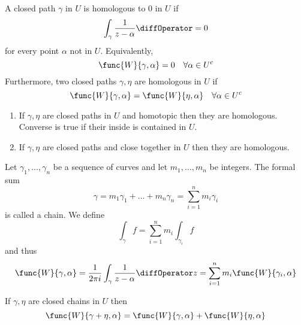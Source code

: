 \begin{definition}
    A closed path \(\gamma\) in \(U\) is homologous to 0 in \(U\) if 
    \begin{equation*}
        \int_{\gamma} \dfrac{1}{z - \alpha} \diffOperator = 0
    \end{equation*}
    for every point \(\alpha\) not in \(U\). Equivalently, 
    \begin{equation*}
        \func{W}{\gamma, \alpha} = 0 \quad \forall \alpha \in U^c
    \end{equation*}
    Furthermore, two closed paths \(\gamma, \eta\) are homologous in \(U\) if 
    \begin{equation*}
        \func{W}{\gamma, \alpha} = \func{W}{\eta, \alpha} \quad \forall \alpha \in U^c
    \end{equation*}
\end{definition}

\begin{theorem}
    \begin{enumerate}
        \item If \(\gamma, \eta\) are closed paths in \(U\) and homotopic then they are homologous. Converse is true if their inside is contained in \(U\).
        \item If \(\gamma, \eta\) are closed paths and close together in \(U\) then they are homologous.
    \end{enumerate}
\end{theorem}

\begin{definition}
    Let \(\gamma_1, \dots , \gamma_n\) be a sequence of curves and let \(m_1, \dots , m_n\) be integers. The formal sum 
    \begin{equation*}
        \gamma = m_1 \gamma_1 + \dots + m_n \gamma_n = \sum_{i = 1}^n m_i \gamma_i
    \end{equation*}
    is called a chain. We define 
    \begin{equation*}
        \int_{\gamma} f = \sum_{i = 1}^n m_i \int_{\gamma_i} f
    \end{equation*}
    and thus 
    \begin{equation*}
        \func{W}{\gamma , \alpha} = \dfrac{1}{2 \pi i } \int_{\gamma} \frac{1}{z - \alpha} \diffOperator z = \sum_{i = 1}^n m_i \func{W}{\gamma_i, \alpha}
    \end{equation*}
\end{definition}

\begin{proposition}
    If \(\gamma, \eta\) are closed chains in \(U\) then 
    \begin{equation*}
        \func{W}{\gamma + \eta, \alpha} = \func{W}{\gamma, \alpha} + \func{W}{\eta, \alpha}
    \end{equation*}
\end{proposition}

